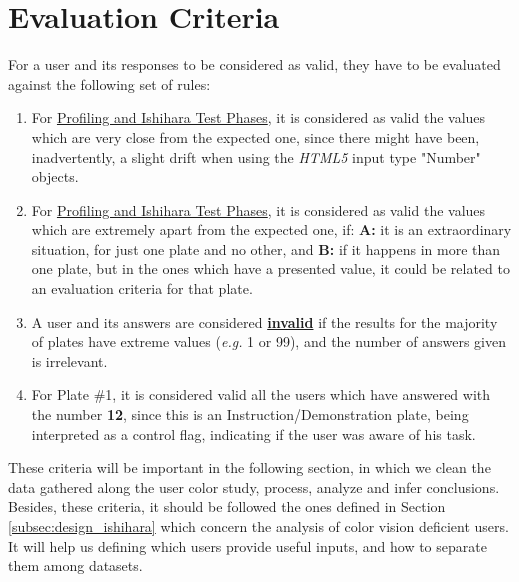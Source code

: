 \section{Evaluation Criteria}
\label{sec:impl_evaluationcriteria}
%
For a user and its responses to be considered as valid, they have to be evaluated against the following set of rules:
%
\begin{enumerate}
	\item For \ul{Profiling and Ishihara Test Phases}, it is considered as valid the values which are very close from the expected one, since there might
	have been, inadvertently, a slight drift when using the \emph{HTML5} input type "Number" objects.
	\item For \ul{Profiling and Ishihara Test Phases}, it is considered as valid the values which are extremely apart from the expected one, if: \textbf{A:}
	it is an extraordinary situation, for just one plate and no other, and \textbf{B:} if it happens in more than one plate, but in the ones which have a
	presented value, it could be related to an evaluation criteria for that plate.
	\item A user and its answers are considered \textbf{\ul{invalid}} if the results for the majority of plates have extreme values (\emph{e.g.} 1 or 99), and
	the number of answers given is irrelevant.
	\item For Plate \#1, it is considered valid all the users which have answered with the number \textbf{12}, since this is an Instruction/Demonstration plate,
	being interpreted as a control flag, indicating if the user was aware of his task.
\end{enumerate}
%
These criteria will be important in the following section, in which we clean the data gathered along the user color study, process, analyze and infer conclusions.
Besides, these criteria, it should be followed the ones defined in Section \ref{subsec:design_ishihara} which concern the analysis of color vision deficient users.
It will help us defining which users provide useful inputs, and how to separate them among datasets.
